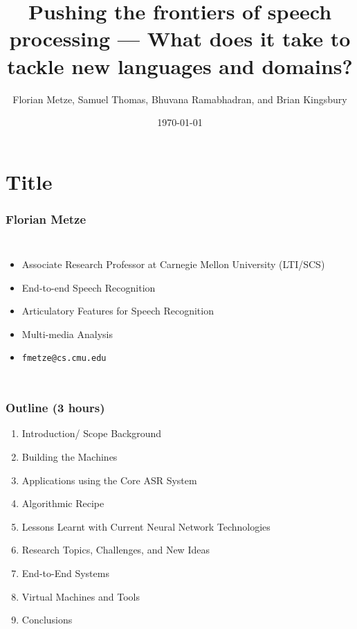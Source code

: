 \documentclass[12pt,xcolor=dvipsnames]{beamer}
\author{Florian Metze, Samuel Thomas, Bhuvana Ramabhadran, and Brian Kingsbury}
\title{{\color{Maroon} Pushing the frontiers of speech processing --- What does it take to tackle new languages and domains?}}
\institute{Carnegie Mellon University and IBM}
\date{\today}
\begin{document}
\section{Title}

\begin{frame}
  \titlepage
\end{frame}

\begin{frame}
  \frametitle{Florian Metze}
  \begin{columns}[c]
    \column{2in}
    \begin{itemize}
    \item Associate Research Professor at Carnegie Mellon University (LTI/SCS)
    \item End-to-end Speech Recognition
    \item Articulatory Features for Speech Recognition
    \item Multi-media Analysis
    \item \texttt{fmetze@cs.cmu.edu}
    \end{itemize}
    \column{2in}
  \end{columns}
\end{frame}

\begin{frame}
  \frametitle{Outline (3 hours)}
  \begin{enumerate}
  \item Introduction/ Scope Background
  \item Building the Machines
  \item Applications using the Core ASR System
  \item Algorithmic Recipe
  \item Lessons Learnt with Current Neural Network Technologies
  \item Research Topics, Challenges, and New Ideas
  \item End-to-End Systems
  \item Virtual Machines and Tools
  \item Conclusions
  \end{enumerate}
\end{frame}
\end{document}
